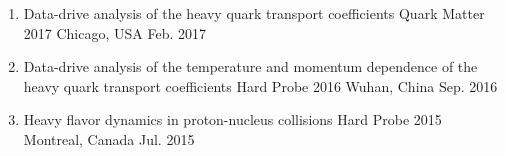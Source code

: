\begin{cventries}
\begin{enumerate}[wide, labelwidth=!, labelindent=0pt]
\item 
  \cvsubsubentry
    { Data-drive analysis of the heavy quark transport coefficients} %
    {Quark Matter 2017} %
    {Chicago, USA} %
    {Feb. 2017} %




\item 
  \cvsubsubentry
    { Data-drive analysis of the temperature and momentum dependence of the heavy quark transport coefficients} %
    {Hard Probe 2016} %
    {Wuhan, China} %
    {Sep. 2016} %



    
  \item 
  \cvsubsubentry
    { Heavy flavor dynamics in proton-nucleus collisions} %
    {Hard Probe 2015} %
    {Montreal, Canada} %
    {Jul. 2015} %


\end{enumerate}














\end{cventries}
